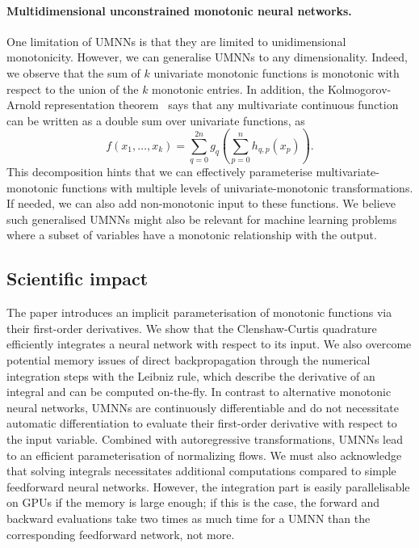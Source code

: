 \paragraph{Multidimensional unconstrained monotonic neural networks.}
One limitation of UMNNs is that they are limited to unidimensional monotonicity. However, we can generalise UMNNs to any dimensionality. Indeed, we observe that the sum of $k$ univariate monotonic functions is monotonic with respect to the union of the $k$ monotonic entries. In addition, the Kolmogorov-Arnold representation theorem~\citep{kolmogorov1956representation, arnold2009functions} says that any multivariate continuous function can be written as a double sum over univariate functions, as
$$ f(x_1, \dots, x_k) = \sum_{q=0}^{2n}g_q\left( \sum_{p=0}^{n} h_{q,p}(x_p) \right). $$
This decomposition hints that we can effectively parameterise multivariate-monotonic functions with multiple levels of univariate-monotonic transformations. If needed, we can also add non-monotonic input to these functions. We believe such generalised UMNNs might also be relevant for machine learning problems where a subset of variables have a monotonic relationship with the output.

\subsection{Scientific impact}
The paper introduces an implicit parameterisation of monotonic functions via their first-order derivatives. We show that the Clenshaw-Curtis quadrature efficiently integrates a neural network with respect to its input. We also overcome potential memory issues of direct backpropagation through the numerical integration steps with the Leibniz rule, which describe the derivative of an integral and can be computed on-the-fly. In contrast to alternative monotonic neural networks, UMNNs are continuously differentiable and do not necessitate automatic differentiation to evaluate their first-order derivative with respect to the input variable. Combined with autoregressive transformations, UMNNs lead to an efficient parameterisation of normalizing flows. We must also acknowledge that solving integrals necessitates additional computations compared to simple feedforward neural networks. However, the integration part is easily parallelisable on GPUs if the memory is large enough; if this is the case, the forward and backward evaluations take two times as much time for a UMNN than the corresponding feedforward network, not more.

